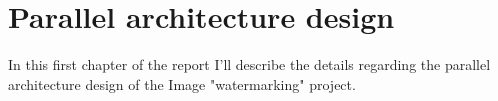 \chapter{Parallel architecture design} %
\label{cha:parallel_architecture_design}
    In this first chapter of the report I'll describe the details regarding the parallel architecture design of
    the Image "watermarking" project.
